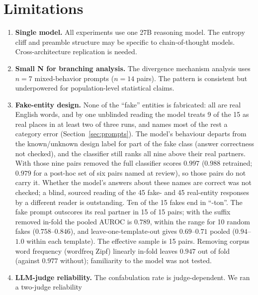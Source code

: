 \documentclass[11pt,a4paper]{article}
\begin{document}
\section{Limitations}

\begin{enumerate}[nosep]
    \item \textbf{Single model.} All experiments use one 27B reasoning
          model. The entropy cliff and preamble structure may be specific
          to chain-of-thought models. Cross-architecture replication is
          needed.
    \item \textbf{Small N for branching analysis.} The divergence mechanism
          analysis uses $n{=}7$ mixed-behavior prompts ($n{=}14$ pairs).
          The pattern is consistent but underpowered for population-level
          statistical claims.
    \item \textbf{Fake-entity design.} None of the ``fake'' entities is
          fabricated: all are real English words, and by one unblinded reading the model treats 9 of the 15 as real places in at least two of three runs, and names most of the rest a category error (Section~\ref{sec:prompts}). The model's behaviour departs from the known/unknown design label for part of the fake class (answer correctness not checked), and the classifier still ranks all nine above their real partners. With those nine pairs removed the full classifier scores $0.997$ ($0.988$ retrained; $0.979$ for a post-hoc set of six pairs named at review), so those pairs do not carry it. Whether the model's answers about these names are correct was not checked; a blind, sourced reading of the 45 fake- and 45 real-entity responses by a different reader is outstanding. Ten
          of the 15 fakes end in ``-ton''. The fake prompt outscores its
          real partner in 15 of 15 pairs; with the suffix removed in-fold
          the pooled AUROC is $0.789$, within the range for 10 random fakes ($0.758$--$0.846$), and leave-one-template-out gives $0.69$--$0.71$ pooled
          ($0.94$--$1.0$ within each template). The effective sample is
          15 pairs. Removing corpus word frequency (wordfreq Zipf) linearly in-fold leaves $0.947$ out of fold (against $0.977$ without); familiarity to the model was not tested.
    \item \textbf{LLM-judge reliability.} The confabulation
          rate is judge-dependent. We ran a two-judge reliability

\end{enumerate}
\end{document}
